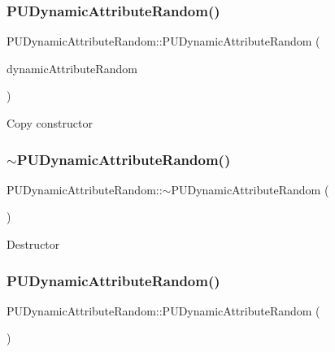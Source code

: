 \subsubsection{\texorpdfstring{P\+U\+Dynamic\+Attribute\+Random()}{PUDynamicAttributeRandom()}\hspace{0.1cm}{\footnotesize\ttfamily [2/4]}}
{\footnotesize\ttfamily P\+U\+Dynamic\+Attribute\+Random\+::\+P\+U\+Dynamic\+Attribute\+Random (\begin{DoxyParamCaption}\item[{const \hyperlink{classPUDynamicAttributeRandom}{P\+U\+Dynamic\+Attribute\+Random} \&}]{dynamic\+Attribute\+Random }\end{DoxyParamCaption})}

Copy constructor \mbox{\label{classPUDynamicAttributeRandom_a438343056409091b7304d9983f4d62cf}} 
\subsubsection{\texorpdfstring{$\sim$\+P\+U\+Dynamic\+Attribute\+Random()}{~PUDynamicAttributeRandom()}\hspace{0.1cm}{\footnotesize\ttfamily [1/2]}}
{\footnotesize\ttfamily P\+U\+Dynamic\+Attribute\+Random\+::$\sim$\+P\+U\+Dynamic\+Attribute\+Random (\begin{DoxyParamCaption}\item[{void}]{ }\end{DoxyParamCaption})}

Destructor \mbox{\label{classPUDynamicAttributeRandom_aa9330b573f4e1f1a042f4e644996a6cd}} 
\subsubsection{\texorpdfstring{P\+U\+Dynamic\+Attribute\+Random()}{PUDynamicAttributeRandom()}\hspace{0.1cm}{\footnotesize\ttfamily [3/4]}}
{\footnotesize\ttfamily P\+U\+Dynamic\+Attribute\+Random\+::\+P\+U\+Dynamic\+Attribute\+Random (\begin{DoxyParamCaption}\item[{void}]{ }\end{DoxyParamCaption})}

